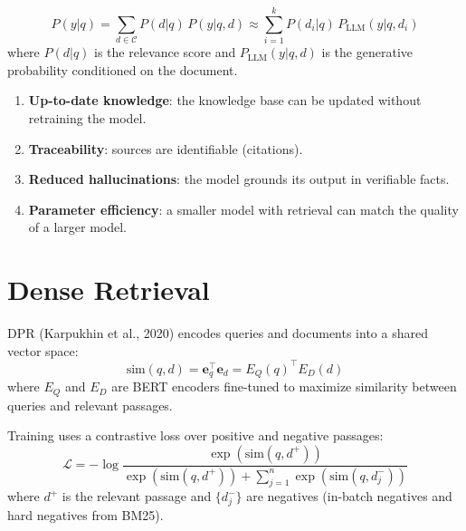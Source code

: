 \begin{keyformulas}[title=\textbf{Probabilistic RAG Formulation}]
\[
    P(y | q) = \sum_{d \in \mathcal{C}} P(d | q) \, P(y | q, d)
    \approx \sum_{i=1}^{k} P(d_i | q) \, P_{\text{LLM}}(y | q, d_i)
\]
where $P(d | q)$ is the relevance score and $P_{\text{LLM}}(y | q, d)$
is the generative probability conditioned on the document.
\end{keyformulas}

\begin{proposition}
\begin{enumerate}
    \item \textbf{Up-to-date knowledge}: the knowledge base can be updated
    without retraining the model.
    \item \textbf{Traceability}: sources are identifiable (citations).
    \item \textbf{Reduced hallucinations}: the model grounds its output
    in verifiable facts.
    \item \textbf{Parameter efficiency}: a smaller model with retrieval
    can match the quality of a larger model.
\end{enumerate}
\end{proposition}

\section{Dense Retrieval}
\label{sec:rag:dense}

\begin{definition}
DPR (Karpukhin et al., 2020) encodes queries and documents into a
shared vector space:
\[
    \text{sim}(q, d) = \mathbf{e}_q^\top \mathbf{e}_d
    = E_Q(q)^\top E_D(d)
\]
where $E_Q$ and $E_D$ are BERT encoders fine-tuned to maximize
similarity between queries and relevant passages.
\end{definition}

\begin{definition}
Training uses a contrastive loss over positive and negative passages:
\[
    \mathcal{L} = -\log \frac{\exp(\text{sim}(q, d^+))}
    {\exp(\text{sim}(q, d^+)) + \sum_{j=1}^{n}
    \exp(\text{sim}(q, d_j^-))}
\]
where $d^+$ is the relevant passage and $\{d_j^-\}$ are negatives
(in-batch negatives and hard negatives from BM25).
\end{definition}

